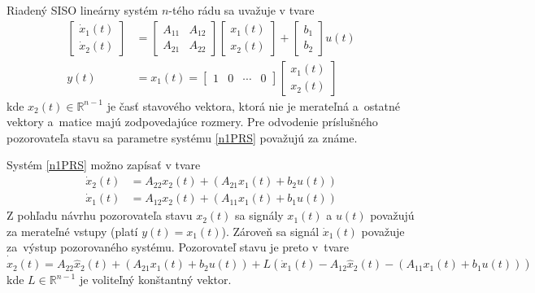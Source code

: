\documentclass[a4paper, 10pt, ]{article}
\begin{document}
Riadený SISO lineárny systém $n$-tého rádu sa uvažuje v tvare
\begin{subequations} \label{n1PRS}
\begin{align}
	\begin{bmatrix}
		\dot{x}_1(t) \\ \dot{x}_2(t)
	\end{bmatrix}
	& =
	\begin{bmatrix}
		A_{11} & A_{12} \\ 	A_{21} & A_{22}
	\end{bmatrix}
	\begin{bmatrix}
		x_1(t) \\ x_2(t)
	\end{bmatrix}
	+
	\begin{bmatrix}
		b_1 \\ b_2
	\end{bmatrix}
	u(t)
	\\
	y(t)
	& =
	x_1(t)
	 =
	\begin{bmatrix}
		1 & 0 & \cdots & 0
	\end{bmatrix}
	\begin{bmatrix}
		x_1(t) \\ x_2(t)
	\end{bmatrix}
\end{align}
\end{subequations}
kde $x_2(t) \in \mathbb{R}^{n-1}$ je časť stavového vektora, ktorá nie je merateľná a~ostatné vektory a~matice majú zodpovedajúce rozmery. Pre odvodenie príslušného pozorovateľa stavu sa parametre systému \eqref{n1PRS} považujú za známe.




Systém \eqref{n1PRS} možno zapísať v tvare
\begin{subequations}
    \begin{align}
    	\dot{x}_2(t) & = A_{22} x_2(t) + \left( A_{21} x_1(t) + b_2 u(t) \right) \\
    	\dot{x}_1(t) & = A_{12} x_2(t) + \left( A_{11} x_1(t) + b_1 u(t) \right)
    \end{align}
\end{subequations}
Z pohľadu návrhu pozorovateľa stavu $x_2(t)$ sa signály $x_1(t)$ a $u(t)$ považujú za merateľné vstupy (platí $y(t) = x_1(t)$). Zároveň sa signál $\dot{x}_1(t)$ považuje za~výstup pozorovaného systému. Pozorovateľ stavu je preto v~tvare
\begin{equation}
	\dot{\hat{x}}_2(t) = A_{22} \hat{x}_2(t) + \left( A_{21} x_1(t) + b_2 u(t) \right) + L \left( \dot{x}_1(t) - A_{12} \hat{x}_2(t) - \left( A_{11} x_1(t) + b_1 u(t) \right) \right)
\end{equation}
kde $L \in \mathbb{R}^{n-1}$ je voliteľný konštantný vektor.
\end{document}
